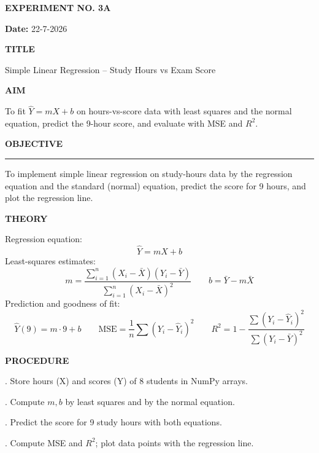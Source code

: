 \documentclass[11pt,twoside]{article}
\newcommand{\expheading}[1]{{\fontsize{14}{17}\selectfont\textbf{#1}\par}}
\newcommand{\fullrule}{\noindent\rule{\textwidth}{0.6pt}\par}
\begin{document}
{\setlength{\parskip}{1pt}\setlength{\abovedisplayskip}{2pt}\setlength{\belowdisplayskip}{2pt}
\begin{center}
\expheading{EXPERIMENT NO. 3A}
\end{center}
\vspace{2pt}

\noindent\textbf{Date:} 22-7-2026\par
\vspace{6pt}

\expheading{TITLE}
\vspace{4pt}
\noindent Simple Linear Regression -- Study Hours vs Exam Score\par
\vspace{4pt}

\expheading{AIM}
\vspace{4pt}
\noindent To fit $\hat{Y}=mX+b$ on hours-vs-score data with least squares and the normal equation, predict the 9-hour score, and evaluate with MSE and $R^2$. \par
\vspace{4pt}

\expheading{OBJECTIVE}
\vspace{2pt}
\fullrule
\vspace{4pt}
\noindent To implement simple linear regression on study-hours data by the regression equation and the standard (normal) equation, predict the score for 9 hours, and plot the regression line. \par
\vspace{4pt}

\expheading{THEORY}
\vspace{4pt}
Regression equation:
\[\hat{Y}=mX+b\]
Least-squares estimates:
\[m=\frac{\sum_{i=1}^{n}(X_i-\bar{X})(Y_i-\bar{Y})}{\sum_{i=1}^{n}(X_i-\bar{X})^2}\qquad b=\bar{Y}-m\bar{X}\]
Prediction and goodness of fit:
\[\hat{Y}(9)=m\cdot9+b\qquad \mathrm{MSE}=\frac{1}{n}\sum(Y_i-\hat{Y}_i)^2\qquad R^2=1-\frac{\sum(Y_i-\hat{Y}_i)^2}{\sum(Y_i-\bar{Y})^2}\]
\vspace{4pt}

\expheading{PROCEDURE}
\vspace{4pt}
. Store hours (X) and scores (Y) of 8 students in NumPy arrays.\par
{}. Compute $m,b$ by least squares and by the normal equation.\par
{}. Predict the score for 9 study hours with both equations.\par
{}. Compute MSE and $R^2$; plot data points with the regression line. \par
\vspace{4pt}

}
\end{document}
